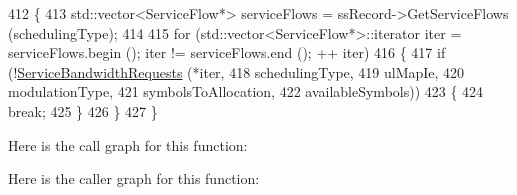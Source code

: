 \begin{DoxyCode}
412 \{
413   std::vector<ServiceFlow*> serviceFlows = ssRecord->GetServiceFlows (schedulingType);
414 
415   \textcolor{keywordflow}{for} (std::vector<ServiceFlow*>::iterator iter = serviceFlows.begin (); iter != serviceFlows.end (); ++
      iter)
416     \{
417       \textcolor{keywordflow}{if} (!\hyperlink{classns3_1_1UplinkSchedulerSimple_ad420cfa439ba7c319fab7dd0db299408}{ServiceBandwidthRequests} (*iter,
418                                      schedulingType,
419                                      ulMapIe,
420                                      modulationType,
421                                      symbolsToAllocation,
422                                      availableSymbols))
423         \{
424           \textcolor{keywordflow}{break};
425         \}
426     \}
427 \}
\end{DoxyCode}


Here is the call graph for this function\+:




Here is the caller graph for this function\+:


